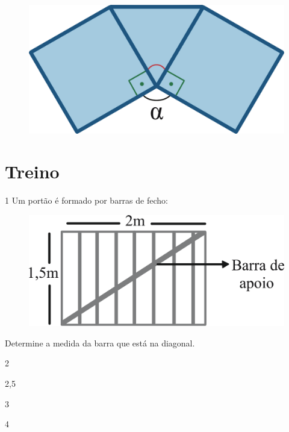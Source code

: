 \begin{figure}[htpb!]
\centering
\includegraphics[width=.5\textwidth]{./ilustras-mat/modulo_11-atividade_10_resposta.png}
\end{figure}

\begin{emptybox}
\end{emptybox}

\pagebreak
\section*{Treino}

\num{1} Um portão é formado por barras de fecho:

\begin{figure}[htpb!]
\centering
\includegraphics[width=\textwidth]{./ilustras-mat/modulo_11-treino_1.png}
\end{figure}

Determine a medida da barra que está na diagonal.

\begin{escolha}
  \item 2

  \item 2,5
  
  \item 3
  
  \item 4
\end{escolha}


